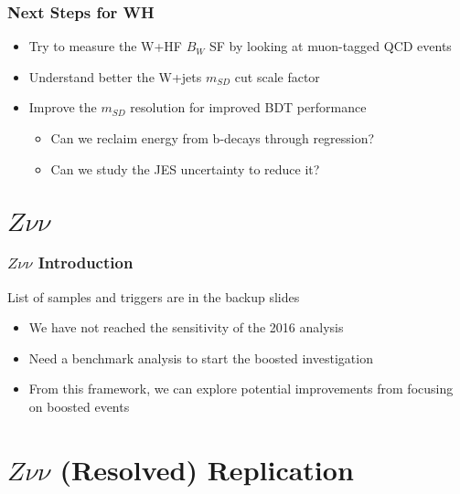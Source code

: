 \documentclass{beamer}
\begin{document}
\begin{frame}
  \frametitle{Next Steps for WH}
  \begin{itemize}
  \item Try to measure the W+HF $B_W$ SF by looking at muon-tagged QCD events
  \item Understand better the W+jets $m_{SD}$ cut scale factor
  \item Improve the $m_{SD}$ resolution for improved BDT performance
    \begin{itemize}
    \item Can we reclaim energy from b-decays through regression?
    \item Can we study the JES uncertainty to reduce it?
    \end{itemize}
  \end{itemize}
\end{frame}

\section{$Z\nu\nu$}

\begin{frame}
  \frametitle{$Z\nu\nu$ Introduction}
  List of samples and triggers are in the backup slides

  \begin{itemize}
  \item We have not reached the sensitivity of the 2016 analysis
  \item Need a benchmark analysis to start the boosted investigation
  \item From this framework, we can explore potential improvements
    from focusing on boosted events
  \end{itemize}

\end{frame}

\section{$Z\nu\nu$ (Resolved) Replication}
\end{document}
